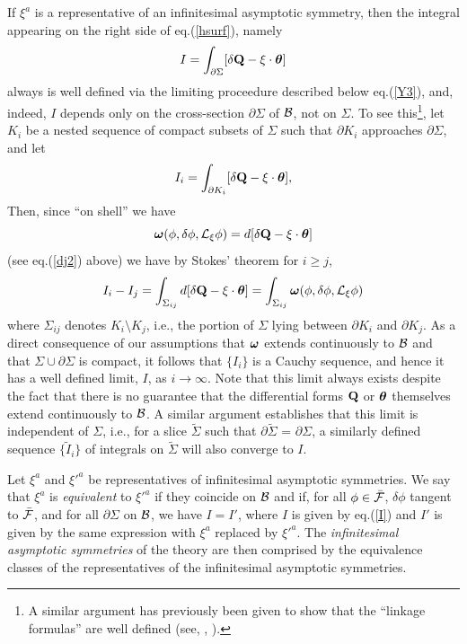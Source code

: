 If $\xi^a$ is a representative of an infinitesimal asymptotic
symmetry, then the integral appearing on the right side of
eq.(\ref{hsurf}), namely
\begin{equation}
I = \int_{\partial \Sigma} [\delta {\bf Q} - \xi \cdot
{\mbox{\boldmath $\theta$}}] 
\label{I}
\end{equation}
always is well defined via the limiting proceedure described below
eq.(\ref{Y3}), and, indeed, $I$ depends only on the cross-section
$\partial \Sigma$ of ${\cal B}$, not on $\Sigma$. To see
this\footnote{A similar argument has previously been given to show
that the ``linkage formulas'' are well defined (see, \cite{tw},
\cite{gw}).}, let $K_i$ be a nested sequence of compact
subsets of $\Sigma$ such that $\partial K_i$ approaches $\partial
\Sigma$, and let
\begin{equation}
I_i = \int_{\partial K_i} [\delta {\bf Q} - \xi \cdot
{\mbox{\boldmath $\theta$}}] ,
\label{Ii}
\end{equation}
Then, since ``on shell'' we have
\begin{equation}
{\mbox{\boldmath $\omega$}} (\phi, \delta \phi, {\cal L}_\xi \phi) =
d [\delta {\bf Q} - \xi \cdot {\mbox{\boldmath $\theta$}}]
\label{omQ}
\end{equation}
(see eq.(\ref{dj2}) above) we have by Stokes' theorem for $i \geq j$,
\begin{equation}
I_i - I_j = \int_{\Sigma_{ij}}d [\delta {\bf Q} - \xi \cdot
{\mbox{\boldmath $\theta$}}] = \int_{\Sigma_{ij}}
{\mbox{\boldmath $\omega$}}(\phi, \delta \phi, {\cal L}_\xi \phi)
\label{Iij}
\end{equation}
where $\Sigma_{ij}$ denotes $K_i \setminus K_j$, i.e., the portion of
$\Sigma$ lying between $\partial K_i$ and $\partial K_j$.  As a direct
consequence of our assumptions that ${\mbox{\boldmath $\omega$}}$
extends continuously to $\cal B$ and that $\Sigma \cup \partial
\Sigma$ is compact, it follows that $\{I_i\}$ is a Cauchy sequence,
and hence it has a well defined limit, $I$, as $i \rightarrow
\infty$. Note that this limit always exists despite the fact that
there is no guarantee that the differential forms ${\bf Q}$ or
${\mbox{\boldmath $\theta$}}$ themselves extend continuously to ${\cal
B}$. A similar argument establishes that this limit is independent of
$\Sigma$, i.e., for a slice $\tilde{\Sigma}$ such that $\partial
\tilde{\Sigma}$ = $\partial \Sigma$, a similarly defined sequence
$\{\tilde{I}_i \}$ of integrals on $\tilde{\Sigma}$ will also converge
to $I$.

Let $\xi^a$ and $\xi'^a$ be representatives of infinitesimal
asymptotic symmetries. We say that $\xi^a$ is {\it equivalent} to
$\xi'^a$ if they coincide on ${\cal B}$ and if, for all $\phi \in
\bar{\cal F}$, $\delta \phi$ tangent to $\bar{\cal F}$, and for all
$\partial \Sigma$ on ${\cal B}$, we have $I = I'$, where $I$ is given
by eq.(\ref{I}) and $I'$ is given by the same expression with $\xi^a$
replaced by $\xi'^a$. The {\it infinitesimal asymptotic symmetries} of
the theory are then comprised by the equivalence classes of the
representatives of the infinitesimal asymptotic symmetries.

